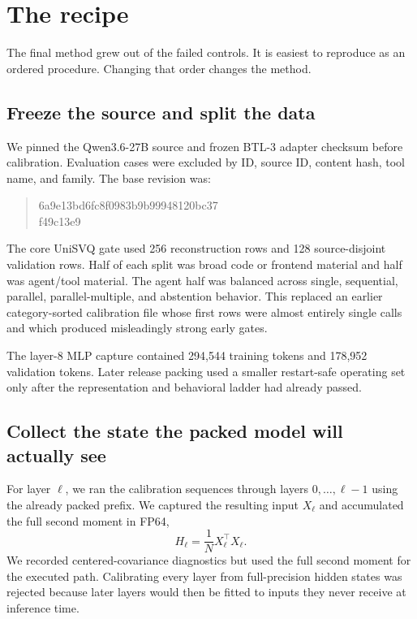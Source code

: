 \documentclass[10pt,twocolumn]{article}
\begin{document}
\section{The recipe}

The final method grew out of the failed controls. It is easiest to reproduce as an ordered procedure. Changing that order changes the method.

\subsection{Freeze the source and split the data}

We pinned the Qwen3.6-27B source and frozen BTL-3 adapter checksum before calibration. Evaluation cases were excluded by ID, source ID, content hash, tool name, and family. The base revision was:

\begin{quote}\footnotesize\ttfamily
6a9e13bd6fc8f0983b9b99948120bc37\\
f49c13e9
\end{quote}

The core UniSVQ gate used 256 reconstruction rows and 128 source-disjoint validation rows. Half of each split was broad code or frontend material and half was agent/tool material. The agent half was balanced across single, sequential, parallel, parallel-multiple, and abstention behavior. This replaced an earlier category-sorted calibration file whose first rows were almost entirely single calls and which produced misleadingly strong early gates.

The layer-8 MLP capture contained 294,544 training tokens and 178,952 validation tokens. Later release packing used a smaller restart-safe operating set only after the representation and behavioral ladder had already passed.

\subsection{Collect the state the packed model will actually see}

For layer $\ell$, we ran the calibration sequences through layers $0,\ldots,\ell-1$ using the already packed prefix. We captured the resulting input $X_\ell$ and accumulated the full second moment in FP64,
\begin{equation}
H_\ell = \frac{1}{N}X_\ell^\top X_\ell.
\end{equation}
We recorded centered-covariance diagnostics but used the full second moment for the executed path. Calibrating every layer from full-precision hidden states was rejected because later layers would then be fitted to inputs they never receive at inference time.
\end{document}

